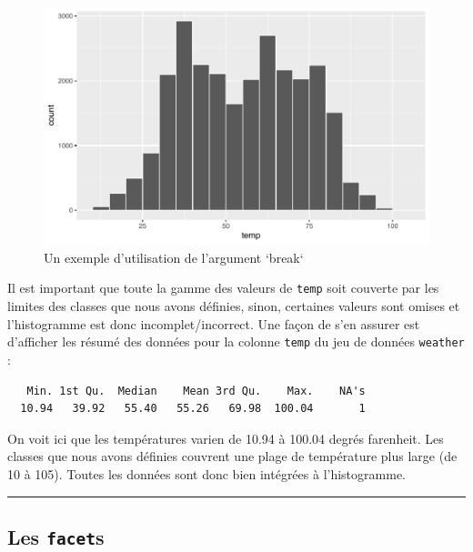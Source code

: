 \documentclass[a4paperpaper,]{article}
\newenvironment{Shaded}{\begin{snugshade}}{\end{snugshade}}
\newcommand{\KeywordTok}[1]{\textcolor[rgb]{0.13,0.29,0.53}{\textbf{#1}}}
\newcommand{\OperatorTok}[1]{\textcolor[rgb]{0.81,0.36,0.00}{\textbf{#1}}}
\newcommand{\NormalTok}[1]{#1}
\theoremstyle{definition}
\theoremstyle{definition}
\theoremstyle{definition}
\theoremstyle{remark}
\begin{document}
\begin{figure}[htpb]

{\centering \includegraphics[width=0.9\linewidth]{figure/break-1} 

}

\caption{Un exemple d'utilisation de l'argument `break`}\label{fig:break}
\end{figure}

Il est important que toute la gamme des valeurs de \texttt{temp} soit
couverte par les limites des classes que nous avons définies, sinon,
certaines valeurs sont omises et l'histogramme est donc
incomplet/incorrect. Une façon de s'en assurer est d'afficher les résumé
des données pour la colonne \texttt{temp} du jeu de données
\texttt{weather} :

\begin{Shaded}
\end{Shaded}

\begin{verbatim}
   Min. 1st Qu.  Median    Mean 3rd Qu.    Max.    NA's 
  10.94   39.92   55.40   55.26   69.98  100.04       1 
\end{verbatim}

On voit ici que les températures varien de 10.94 à 100.04 degrés
farenheit. Les classes que nous avons définies couvrent une plage de
température plus large (de 10 à 105). Toutes les données sont donc bien
intégrées à l'histogramme.

\begin{center}\rule{0.5\linewidth}{\linethickness}\end{center}

\subsection{\texorpdfstring{Les
\texttt{facet}s}{Les facets}}\label{facets}
\end{document}
